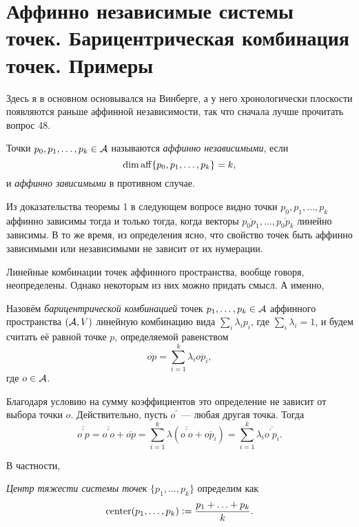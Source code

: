 \section{Аффинно независимые системы точек. Барицентрическая комбинация точек. Примеры}

Здесь я в основном основывался на Винберге, а у него хронологически плоскости появляются раньше аффинной независимости, так что сначала лучше прочитать вопрос 48.

\begin{definition}
    Точки $p_0, p_1, \ldots, p_k \in \mathcal{A}$ называются \textit{аффинно независимыми}, если \[\dim\operatorname{aff}\{p_0, p_1, \ldots, p_k\} = k,\] и \textit{аффинно зависимыми} в противном случае.
\end{definition}

Из доказательства теоремы 1 в следующем вопросе видно точки $p_0, p_1, \ldots, p_k$ аффинно зависимы тогда и только тогда, когда векторы $\overline{p_0p_1}, \ldots, \overline{p_0p_k}$ линейно зависимы. В то же время, из определения ясно, что свойство точек быть аффинно зависимыми или независимыми не зависит от их нумерации.

Линейные комбинации точек аффинного пространства, вообще говоря, неопределены. Однако некоторым из них можно придать смысл. А именно,

\begin{definition}
    Назовём \textit{барицентрической комбинацией} точек $p_1, \ldots, p_k \in \mathcal{A}$ аффинного пространства $(\mathcal{A}, V)$ линейную комбинацию вида $\sum\limits_i\lambda_ip_i$, где $\sum\limits_i\lambda_i = 1$, и будем считать её равной точке $p$, определяемой равенством
    \[
        \overline{op} = \sum_{i = 1}^k\lambda_i\overline{op_i},
    \]
    где $o \in \mathcal{A}$.
\end{definition}

Благодаря условию на сумму коэффициентов это определение не зависит от выбора точки $o$. Действительно, пусть $o^\prime$ --- любая другая точка. Тогда
\[
    \overline{o^\prime p} = \overline{o^\prime o} + \overline{op} = \sum_{i = 1}^k\lambda(\overline{o^\prime o} + \overline{op_i}) = \sum_{i = 1}^k\lambda_i\overline{o^\prime p_i}.
\]

В частности,

\begin{definition}
    \textit{Центр тяжести системы точек} $\{p_1, \ldots, p_k\}$ определим как
    \[
        \operatorname{center}(p_1, \ldots, p_k) \vcentcolon = \frac{p_1 + \ldots + p_k}{k}.
    \]
\end{definition}

